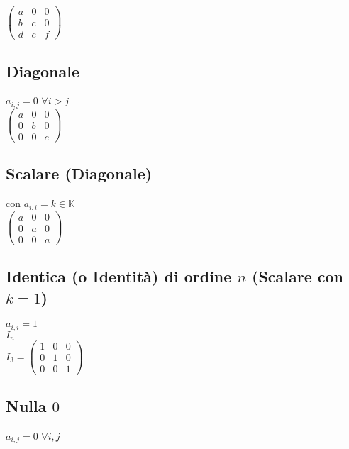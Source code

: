 \documentclass[a4paper, twoside, italian, 11pt]{book}
\newcommand{\K}{\mathbb K}
\begin{document}
\noindent
$\begin{pmatrix}
a & 0 & 0 \\
b & c & 0 \\
d & e & f
\end{pmatrix}$


\subsection{Diagonale}

$a_{i,j} = 0$ $\forall i > j$ \\

\noindent
$\begin{pmatrix}
a & 0 & 0 \\
0 & b & 0 \\
0 & 0 & c
\end{pmatrix}$


\subsection{Scalare (Diagonale)}

con $a_{i,i} = k \in \K$ \\

\noindent
$\begin{pmatrix}
a & 0 & 0 \\
0 & a & 0 \\
0 & 0 & a
\end{pmatrix}$


\subsection{Identica (o Identità) di ordine $n$ (Scalare con $k = 1$)}

$a_{i,i} = 1$ \\

\noindent
$I_n$ \\

\noindent
$I_3 = \begin{pmatrix}
1 & 0 & 0 \\
0 & 1 & 0 \\
0 & 0 & 1
\end{pmatrix}$


\subsection{Nulla $\underline{0}$}

$a_{i,j} = 0$ $\forall i, j$ \\
\end{document}

